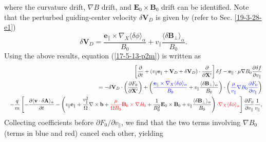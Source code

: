 \documentclass{llncs}
\newcommand{\tmcolor}[2]{{\color{#1}{#2}}}
\begin{document}
where the curvature drift, $\nabla B$ drift, and $\mathbf{E}_0 \times
\mathbf{B}_0$ drift can be identified. Note that the perturbed guiding-center
velocity $\delta \mathbf{V}_D$ is given by (refer to Sec. \ref{19-3-28-e1})
\begin{equation}
  \delta \mathbf{V}_D = \frac{\mathbf{e}_{\parallel} \times \nabla_X \langle
  \delta \phi \rangle_{\alpha}}{B_0} + v_{\parallel} \frac{\langle \delta
  \mathbf{B}_{\perp} \rangle_{\alpha}}{B_0} .
\end{equation}
Using the above results, equation (\ref{17-5-13-p2m}) is written as
\begin{eqnarray}
  &  & \left[ \frac{\partial}{\partial t} + (v_{\parallel}
  \mathbf{e}_{\parallel} +\mathbf{V}_D + \delta \mathbf{V}_D) \cdot
  \frac{\partial}{\partial \mathbf{X}'} \right] \delta f
  -\mathbf{e}_{\parallel} \cdot \mu \nabla B_0 \frac{\partial \delta
  f}{\partial v_{\parallel}} \nonumber\\
  &  & = - \delta \mathbf{V}_D \cdot \left( \frac{\partial F_0}{\partial
  \mathbf{X}'} \right) + \left( \tmcolor{blue}{\frac{\mathbf{e}_{\parallel}
  \times \nabla_X \langle \delta \phi \rangle_{\alpha}}{B_0}} + v_{\parallel}
  \frac{\langle \delta \mathbf{B}_{\perp} \rangle_{\alpha}}{B_0} \right) \cdot
  \left( \tmcolor{blue}{\frac{\mu}{v_{\parallel}} \nabla B_0 \frac{\partial
  F_0}{\partial v_{\parallel}}} \right) \nonumber\\
  &  & - \frac{q}{m} \left[ - \frac{\partial \langle \mathbf{v} \cdot \delta
  \mathbf{A} \rangle_{\alpha}}{\partial t} - \left( v_{\parallel}
  \mathbf{e}_{\parallel} + \frac{v_{\parallel}^2}{\Omega} \nabla \times
  \mathbf{b}+ \tmcolor{red}{\frac{\mu}{\Omega B_0} \mathbf{B}_0 \times \nabla
  B_0} + \frac{1}{B_0^2} \mathbf{E}_0 \times \mathbf{B}_0 + v_{\parallel}
  \frac{\langle \delta \mathbf{B}_{\perp} \rangle_{\alpha}}{B_0} \right)
  \tmcolor{red}{\cdot \nabla_X \langle \delta \phi \rangle_{\alpha}} \right]
  \frac{\partial F_0}{\partial v_{\parallel}}  \frac{1}{v_{\parallel}}, 
\end{eqnarray}
Collecting coefficients before $\partial F_0 / \partial v_{\parallel}$, we
find that the two terms involving $\nabla B_0$ (terms in blue and red) cancel
each other, yielding
\end{document}
